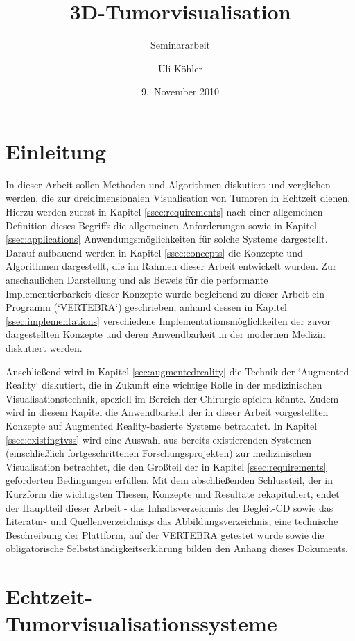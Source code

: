 \documentclass[a4paper,titlepage,12pt]{scrartcl}
\title{3D-Tumorvisualisation}
\subtitle{Seminararbeit}
\author{Uli Köhler}
\date{9.~November 2010}
\newtheorem[L]{boxedDefinition}{Definition}
\begin{document}
\maketitle\thispagestyle{empty}\newpage
\tableofcontents\thispagestyle{empty}\newpage
\section{Einleitung}\label{sec:introduction}
In dieser Arbeit sollen Methoden und Algorithmen diskutiert und verglichen werden, die zur dreidimensionalen Visualisation von Tumoren in Echtzeit dienen. Hierzu werden zuerst in Kapitel \vref{ssec:requirements} nach einer allgemeinen Definition dieses Begriffs die allgemeinen Anforderungen sowie in Kapitel \vref{ssec:applications} Anwendungsmöglichkeiten für solche Systeme dargestellt. Darauf aufbauend werden in Kapitel \vref{ssec:concepts} die Konzepte und Algorithmen dargestellt, die im Rahmen dieser Arbeit entwickelt wurden. Zur anschaulichen Darstellung und als Beweis für die performante Implementierbarkeit dieser Konzepte wurde begleitend zu dieser Arbeit ein Programm (`VERTEBRA`) geschrieben, anhand dessen in Kapitel \vref{ssec:implementations} verschiedene Implementationsmöglichkeiten der zuvor dargestellten Konzepte und deren Anwendbarkeit in der modernen Medizin diskutiert werden. 

Anschließend wird in Kapitel \vref{sec:augmentedreality} die Technik der `Augmented Reality` diskutiert, die in Zukunft eine wichtige Rolle in der medizinischen Visualisationstechnik, speziell im Bereich der Chirurgie spielen könnte. Zudem wird in diesem Kapitel die Anwendbarkeit der in dieser Arbeit vorgestellten Konzepte auf Augmented Reality-basierte Systeme betrachtet.
In Kapitel \vref{ssec:existingtvss} wird eine Auswahl aus bereits existierenden Systemen (einschließlich fortgeschrittenen Forschungsprojekten) zur medizinischen Visualisation betrachtet, die den Großteil der in Kapitel \ref{ssec:requirements} geforderten Bedingungen erfüllen.
Mit dem abschließenden Schlussteil, der in Kurzform die wichtigsten Thesen, Konzepte und Resultate rekapituliert, endet der Hauptteil dieser Arbeit - das Inhaltsverzeichnis der Begleit-CD sowie das Literatur- und Quellenverzeichnis,s das Abbildungsverzeichnis, eine technische Beschreibung der Plattform, auf der VERTEBRA getestet wurde sowie die obligatorische Selbstständigkeitserklärung bilden den Anhang dieses Dokuments.
\section{Echtzeit-Tumorvisualisationssysteme}\label{sec:vissystems}
\end{document}
